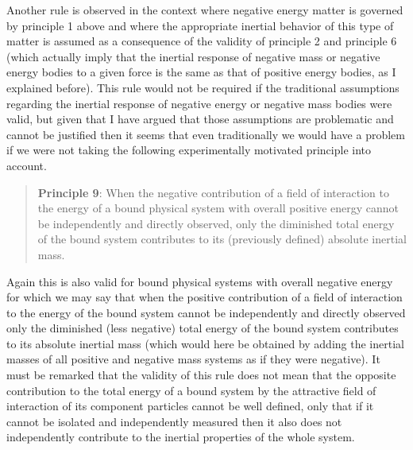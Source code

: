 \documentclass[notitlepage,12pt]{report}
\begin{document}
Another rule is observed in the context where negative energy matter is governed by principle 1 above and where the appropriate inertial behavior of this type of matter is assumed as a consequence of the validity of principle 2 and principle 6 (which actually imply that the inertial response of negative mass or negative energy bodies to a given force is the same as that of positive energy bodies, as I explained before). This rule would not be required if the traditional assumptions regarding the inertial response of negative energy or negative mass bodies were valid, but given that I have argued that those assumptions are problematic and cannot be justified then it seems that even traditionally we would have a problem if we were not taking the following experimentally motivated principle into account.
\begin{quote}
\textbf{Principle 9}: When the negative contribution of a field of interaction to the energy of a bound physical system with overall positive energy cannot be independently and directly observed, only the diminished total energy of the bound system contributes to its (previously defined) absolute inertial mass.
\end{quote}
Again this is also valid for bound physical systems with overall negative energy for which we may say that when the positive contribution of a field of interaction to the energy of the bound system cannot be independently and directly observed only the diminished (less negative) total energy of the bound system contributes to its absolute inertial mass (which would here be obtained by adding the inertial masses of all positive and negative mass systems as if they were negative). It must be remarked that the validity of this rule does not mean that the opposite contribution to the total energy of a bound system by the attractive field of interaction of its component particles cannot be well defined, only that if it cannot be isolated and independently measured then it also does not independently contribute to the inertial properties of the whole system.
\end{document}
